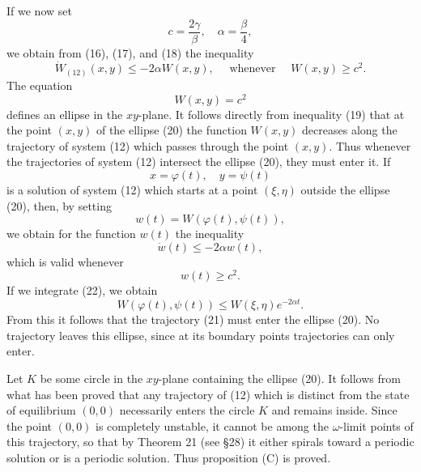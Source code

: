 \documentclass[10pt,a5paper]{book}
\theoremstyle{plain}
\theoremstyle{definition}
\theoremstyle{remark}
\begin{document}
If we now set
\[
c=\frac{2 \gamma}{\beta}, \quad \alpha=\frac{\beta}{4},
\]
we obtain from (16), (17), and (18) the inequality
\begin{equation*}
\dot{W}_{(12)}(x, y) \leq-2 \alpha W(x, y), \quad \text { whenever } \quad W(x, y) \geq c^{2} . \tag{19}
\end{equation*}
The equation
\begin{equation*}
W(x, y)=c^{2} \tag{20}
\end{equation*}
defines an ellipse in the $x y$-plane. It follows directly from inequality (19) that at the point $(x, y)$ of the ellipse (20) the function $W(x, y)$ decreases along the trajectory of system (12) which passes through the point $(x, y)$. Thus whenever the trajectories of system (12) intersect the ellipse (20), they must enter it. If
\begin{equation*}
x=\varphi(t), \quad y=\psi(t) \tag{21}
\end{equation*}
is a solution of system (12) which starts at a point $(\xi, \eta)$ outside the ellipse (20), then, by setting
\[
w(t)=W(\varphi(t), \psi(t)),
\]
we obtain for the function $w(t)$ the inequality
\begin{equation*}
\dot{w}(t) \leq-2 \alpha w(t), \tag{22}
\end{equation*}
which is valid whenever
\[
w(t) \geq c^{2} .
\]
If we integrate (22), we obtain
\[
W(\varphi(t), \psi(t)) \leq W(\xi, \eta) e^{-2 \alpha t} .
\]
From this it follows that the trajectory (21) must enter the ellipse (20). No trajectory leaves this ellipse, since at its boundary points trajectories can only enter.

Let $K$ be some circle in the $x y$-plane containing the ellipse (20). It follows from what has been proved that any trajectory of (12) which is distinct from the state of equilibrium $(0,0)$ necessarily enters the circle $K$ and remains inside. Since the point $(0,0)$ is completely unstable, it cannot be among the $\omega$-limit points of this trajectory, so that by Theorem 21 (see §28) it either spirals toward a periodic solution or is a periodic solution. Thus proposition (C) is proved.
\end{document}
